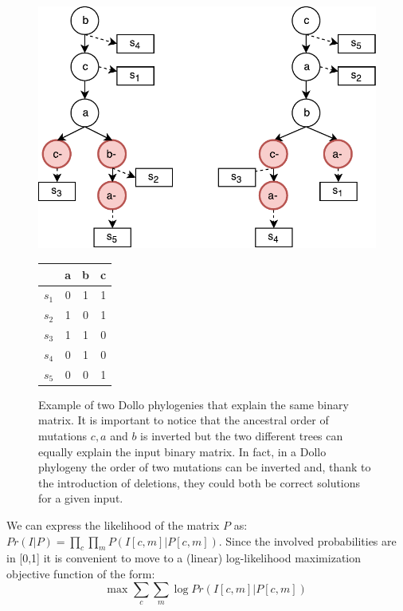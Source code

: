 \documentclass[a4paper,USenglish]{article}
\theoremstyle{definition}
\begin{document}
\begin{figure}[!tb]
  \begin{minipage}{0.72\linewidth}
    \includegraphics[scale=.65]{img/dollo_non_unique}
  \end{minipage}
  \begin{minipage}{0.2\linewidth}
    \begin{tabular}[!t]{c|ccc}
      & a & b & c \\ \hline
      $s_1$ & 0 & 1 & 1 \\
      $s_2$ & 1 & 0 & 1 \\
      $s_3$ & 1 & 1 & 0 \\
      $s_4$ & 0 & 1 & 0 \\
      $s_5$ & 0 & 0 & 1
    \end{tabular}
  \end{minipage}
  \caption{Example of two Dollo phylogenies that explain the same
    binary matrix.  It is important to notice that the ancestral order
    of mutations $c,a$ and $b$ is inverted but the two different trees
    can equally explain the input binary matrix. In fact, in a Dollo
    phylogeny the order of two mutations can be inverted and, thank to
    the introduction of deletions, they could both be correct
    solutions for a given input.  }
  \label{fig:dollo_non_unique}
\end{figure}

We can express the likelihood of the matrix $P$ as:
$Pr(I|P) = \prod_{c} \prod_{m} P(I[c,m] | P[c,m])$.  Since the
involved probabilities are in [0,1] it is convenient to move to a
(linear) log-likelihood maximization objective function of the form:
\begin{equation}
  \label{eq:log-likelihood}
  \mbox{max } \sum_c \sum_m \log Pr\left( I[c,m] | P[c,m]\right)
\end{equation}
\end{document}

